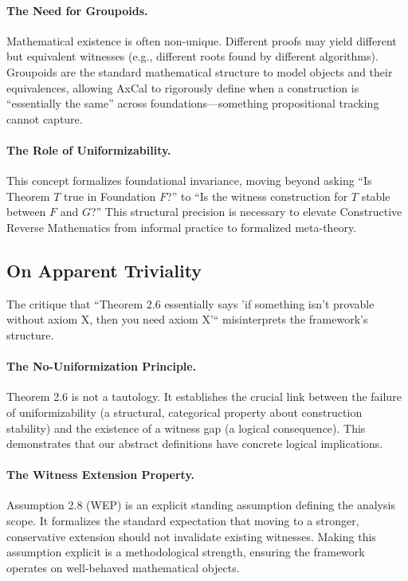 \documentclass[11pt]{article}
\theoremstyle{plain}
\theoremstyle{definition}
\begin{document}
\paragraph{The Need for Groupoids.} Mathematical existence is often non-unique. Different proofs may yield different but equivalent witnesses (e.g., different roots found by different algorithms). Groupoids are the standard mathematical structure to model objects and their equivalences, allowing AxCal to rigorously define when a construction is ``essentially the same'' across foundations—something propositional tracking cannot capture.

\paragraph{The Role of Uniformizability.} This concept formalizes foundational invariance, moving beyond asking ``Is Theorem $T$ true in Foundation $F$?'' to ``Is the witness construction for $T$ stable between $F$ and $G$?'' This structural precision is necessary to elevate Constructive Reverse Mathematics from informal practice to formalized meta-theory.

\subsection{On Apparent Triviality}

The critique that ``Theorem 2.6 essentially says 'if something isn't provable without axiom X, then you need axiom X'`` misinterprets the framework's structure.

\paragraph{The No-Uniformization Principle.} Theorem 2.6 is not a tautology. It establishes the crucial link between the failure of uniformizability (a structural, categorical property about construction stability) and the existence of a witness gap (a logical consequence). This demonstrates that our abstract definitions have concrete logical implications.

\paragraph{The Witness Extension Property.} Assumption 2.8 (WEP) is an explicit standing assumption defining the analysis scope. It formalizes the standard expectation that moving to a stronger, conservative extension should not invalidate existing witnesses. Making this assumption explicit is a methodological strength, ensuring the framework operates on well-behaved mathematical objects.
\end{document}
